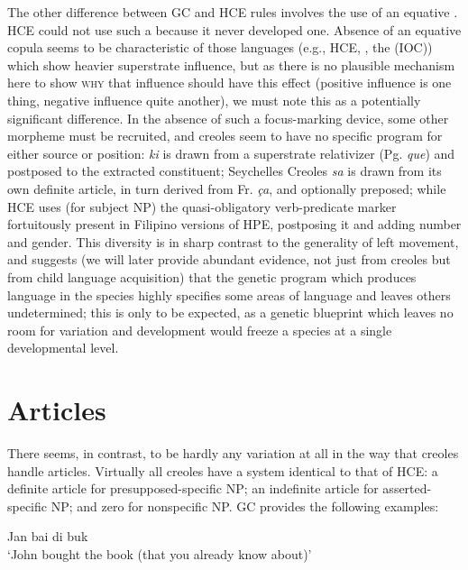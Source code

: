 The other difference between GC and HCE rules involves the use of an equative . HCE could not use such a  because it never developed one. Absence of an equative copula seems to be characteristic of those languages (e.g., HCE, , the  (IOC)) which show heavier superstrate influence, but as there is no plausible mechanism here to show \textsc{why} that influence should have this effect (positive influence is one thing, negative influence quite
another), we must note this as a potentially significant difference. In the absence of such a focus-marking device, some other morpheme must be recruited, and creoles seem to have no specific program for either source or position:  \textit{ki} is drawn from a superstrate rela\-tivizer (Pg. \textit{que}) and postposed to the extracted constituent; Seychelles Creoles \textit{sa} is drawn from its own definite article, in turn derived from Fr. \textit{ça}, and optionally preposed; while HCE uses (for subject NP) the quasi-obligatory verb-predicate marker fortuitously present in Filipino versions of HPE, postposing it and adding number and gender. This diversity is in sharp contrast to the generality of left movement, and suggests (we will later provide abundant evidence, not just from creoles but from child language acquisition) that the genetic program which produces language in the species highly specifies some areas of language and leaves others undetermined; this is only to be expected, as a genetic blueprint which leaves no room for variation and development would freeze a species at a single developmental level.

\section{Articles}

There seems, in contrast, to be hardly any variation at all in the way that creoles handle articles. Virtually all creoles have a system identical to that of HCE: a definite article for presupposed-specific NP; an indefinite article for asserted-specific NP; and zero for nonspecific NP. GC provides the following examples:

\ea\label{ex:2:13}
Jan bai di buk\\
\glt `John bought the book (that you already know about)'
\z


